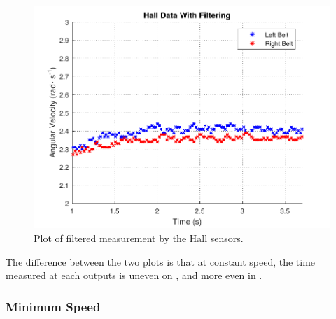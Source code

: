 \begin{figure}[H]
	\centering
	\includegraphics[scale=0.9]{figures/filteredHall.pdf}
	\caption{Plot of filtered measurement by the Hall sensors.}
	\label{filteredHall}
\end{figure}

The difference between the two plots is that at constant speed, the time measured at each outputs is uneven on , and more even in . 




\subsubsection{Minimum Speed}

